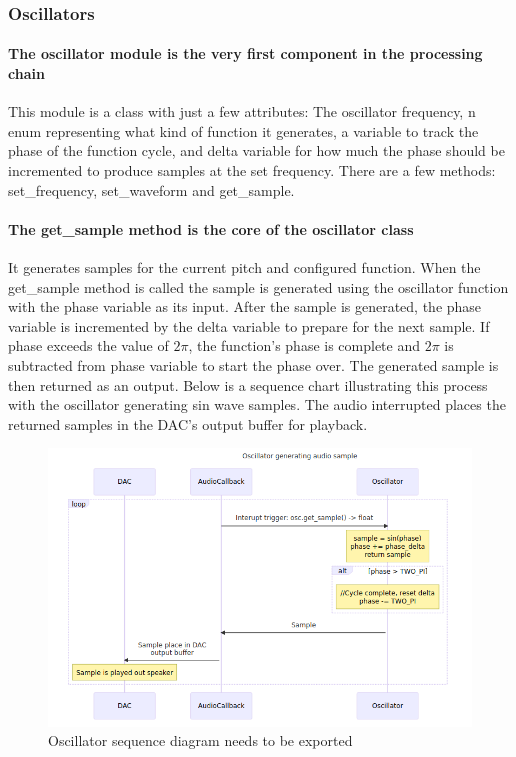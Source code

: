 \documentclass[acmlarge,screen]{acmart}
\begin{document}
	\subsubsection{Oscillators}
	\paragraph{The oscillator module is the very first component in the processing chain} This module is a class with just a few attributes: The oscillator frequency, n enum representing what kind of function it generates, a variable to track the phase of the function cycle, and delta variable for how much the phase should be incremented to produce samples at the set frequency. There are a few methods: set\_frequency, set\_waveform and get\_sample. 
		
	\paragraph{The get\_sample method is the core of the oscillator class} It generates samples for the current pitch and configured function. When the get\_sample method is called the sample is generated using the oscillator function with the phase variable as its input. After the sample is generated, the phase variable is incremented by the delta variable to prepare for the next sample. If phase exceeds the value of \( 2\pi \), the function's phase is complete and \( 2\pi \) is subtracted from phase variable to start the phase over. The generated sample is then returned as an output. Below is a sequence chart illustrating this process with the oscillator generating sin wave samples. The audio interrupted places the returned samples in the DAC's output buffer for playback.\cite{farnell_2010}
	
	\begin{figure}
		\includegraphics[width=\linewidth]{oscillator_sequence_diagram}
		\caption{Oscillator sequence diagram needs to be exported}
		\centering
	\end{figure}
	
\end{document}
